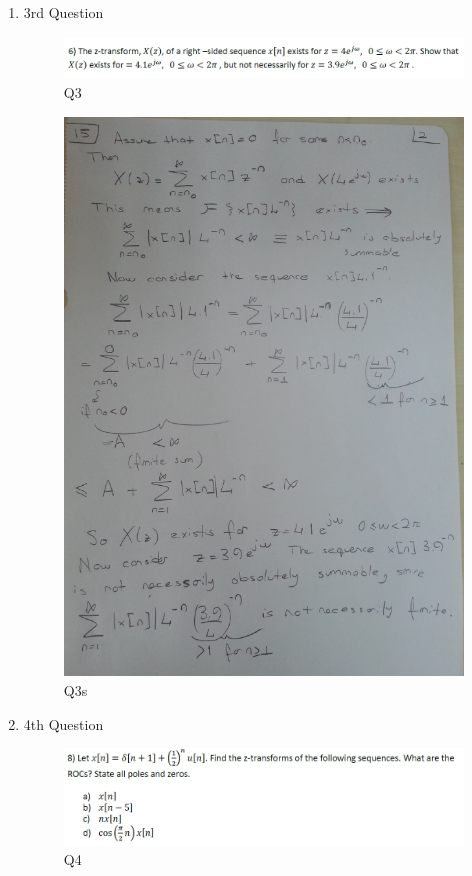 \documentclass[a4paper,12pt]{article}
\begin{document}
\begin{enumerate}
				
	\item 3rd Question
		\begin{figure}[H]
			\center
			\setlength{\unitlength}{\textwidth} 
			\includegraphics[width=1.0\unitlength]{../images/Q6}
			\caption{\label{fig:Q3}Q3 }
		\end{figure}
		
		\begin{figure}[H]
			\center
			\setlength{\unitlength}{\textwidth} 
			\includegraphics[width=1.0\unitlength]{../images/Q6s}
			\caption{\label{fig:Q3s}Q3s }
		\end{figure}
		
	\newpage
		
	\item 4th Question
		\begin{figure}[H]
			\center
			\setlength{\unitlength}{\textwidth} 
			\includegraphics[width=1.0\unitlength]{../images/Q8}
			\caption{\label{fig:Q4}Q4 }
		\end{figure}
		

\end{enumerate}
\end{document}
